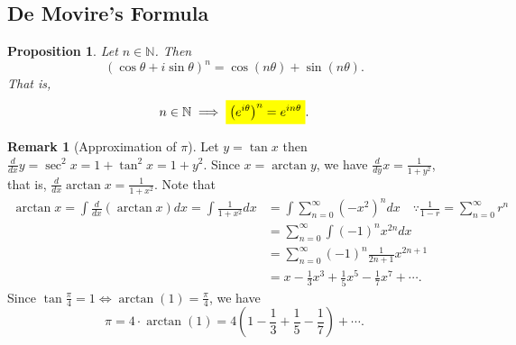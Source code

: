 \documentclass[12pt,openany]{book}
\newcommand{\mathcolorbox}[2]{\colorbox{#1}{$\displaystyle #2$}}
\newtheorem{proposition}[theorem]{Proposition}
\theoremstyle{definition}
\newtheorem{remark}{Remark}[section]
\newcommand{\N}{\mathbb{N}}
\newcommand{\of}[1]{\left( #1 \right)}
\begin{document}
	\subsection{De Movire's Formula}
	\begin{tcolorbox}[colback=white,colframe=procolor, title={\color{white}\bf De Moivre's Formula}]
		\begin{proposition}
			Let $n\in\N$. Then \[
			\of{\cos\theta+i\sin\theta}^n=\cos(n\theta)+\sin(n\theta).
			\]  That is, \[
			n\in\N\implies \mathcolorbox{-blue}{\of{e^{i\theta}}^n=e^{in\theta}}.
			\]
		\end{proposition}
	\end{tcolorbox}
	\newpage
	\begin{remark}[Approximation of $\pi$]
		Let $y=\tan x$ then $\frac{d}{dx}y=\sec^2x=1+\tan^2x=1+y^2$. Since $x=\arctan y$, we have $\frac{d}{dy}x=\frac{1}{1+y^2}$, that is, $\frac{d}{dx}\arctan x=\frac{1}{1+x^2}$. Note that \begin{align*}
		\arctan x =\int\frac{d}{dx}\of{\arctan x}dx=\int\frac{1}{1+x^2}dx
		&=\int\sum_{n=0}^\infty\of{-x^2}^ndx\quad\because\frac{1}{1-r}=\sum_{n=0}^\infty r^n\\
		&=\sum_{n=0}^\infty\int(-1)^nx^{2n}dx\\
		&=\sum_{n=0}^\infty(-1)^n\frac{1}{2n+1}x^{2n+1}\\
		&=x-\frac{1}{3}x^3+\frac{1}{5}x^5-\frac{1}{7}x^7+\cdots.
		\end{align*} Since $\tan\frac{\pi}{4}=1\Leftrightarrow\arctan(1)=\frac{\pi}{4}$, we have \[
		\pi=4\cdot\arctan(1)=4\of{1-\frac{1}{3}+\frac{1}{5}-\frac{1}{7}}+\cdots.
		\]
	\end{remark}
	\vspace{8pt}
\end{document}
